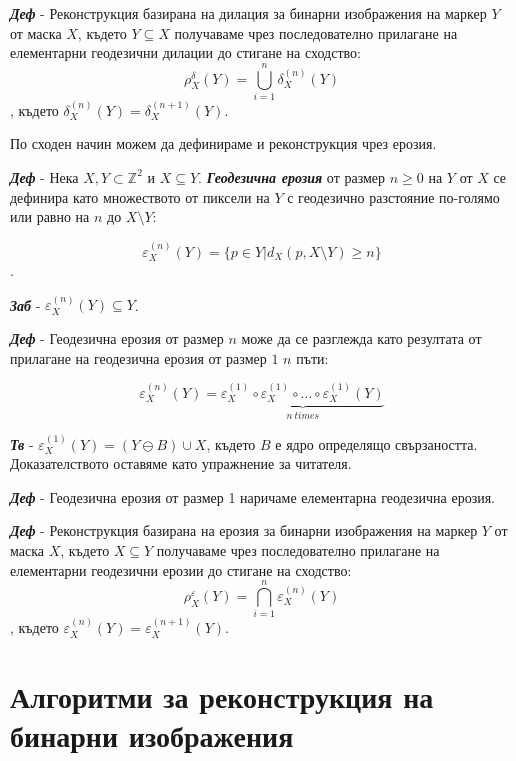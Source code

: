 \documentclass[fleqn,12pt]{article}
\begin{document}
\bigbreak

\textit{\textbf{Деф}} - Реконструкция базирана на дилация за бинарни изображения на маркер $Y$ от маска $X$, където $Y \subseteq X$ получаваме чрез последователно прилагане на елементарни геодезични дилации до стигане на сходство:
$$\rho_X^\delta (Y) = \bigcup_{i=1}^{n} \delta_X^{(n)} (Y)$$, където $\delta_X^{(n)} (Y) = \delta_X^{(n + 1)} (Y)$.

\bigbreak

По сходен начин можем да дефинираме и реконструкция чрез ерозия.

\textit{\textbf{Деф}} - Нека $X, Y \subset \mathbb{Z}^2$ и $X \subseteq Y$. \textit{\textbf{Геодезична ерозия}} от размер $n \geq 0$ на $Y$ от $X$ се дефинира като множеството от пиксели на $Y$ с геодезично разстояние по-голямо или равно на $n$ до $X \setminus Y$:

$$\varepsilon_X^{(n)} (Y) = \{p \in Y | d_X(p, X \setminus Y) \geq n\}$$.

\bigbreak

\textit{\textbf{Заб}} - $\varepsilon_X^{(n)} (Y)  \subseteq Y$.

\bigbreak

\textit{\textbf{Деф}} - Геодезична ерозия от размер $n$ може да се разглежда като резултата от прилагане на геодезична ерозия от размер $1$ $n$ пъти:

$$
    \varepsilon_X^{(n)} (Y) = \underbrace{\varepsilon_X^{(1)} \circ \varepsilon_X^{(1)} \circ \dots \circ \varepsilon_X^{(1)} (Y)}_{n\ times}
$$

\bigbreak

\textit{\textbf{Тв}} - $\varepsilon_X^{(1)} (Y) = (Y \ominus B) \cup X$, където $B$ е ядро определящо свързаността. Доказателството оставяме като упражнение за читателя.

\bigbreak

\textit{\textbf{Деф}} - Геодезична ерозия от размер 1 наричаме елементарна геодезична ерозия.

\bigbreak

\textit{\textbf{Деф}} - Реконструкция базирана на ерозия за бинарни изображения на маркер $Y$ от маска $X$, където $X \subseteq Y$ получаваме чрез последователно прилагане на елементарни геодезични ерозии до стигане на сходство:
$$\rho_X^\varepsilon (Y) = \bigcap_{i=1}^{n} \varepsilon_X^{(n)} (Y)$$, където $\varepsilon_X^{(n)} (Y) = \varepsilon_X^{(n+1)} (Y)$.

\section{Алгоритми за реконструкция на бинарни изображения}
\end{document}
